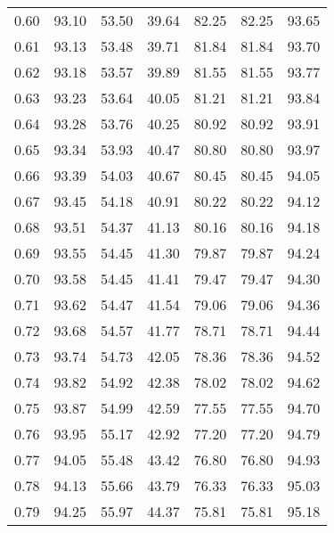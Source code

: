 \begin{tabular}{|c|c|c|c|c|c|c|}
      0.60 &     93.10 &     53.50 &      39.64 &   82.25 &      82.25 &         93.65 \\
      0.61 &     93.13 &     53.48 &      39.71 &   81.84 &      81.84 &         93.70 \\
      0.62 &     93.18 &     53.57 &      39.89 &   81.55 &      81.55 &         93.77 \\
      0.63 &     93.23 &     53.64 &      40.05 &   81.21 &      81.21 &         93.84 \\
      0.64 &     93.28 &     53.76 &      40.25 &   80.92 &      80.92 &         93.91 \\
      0.65 &     93.34 &     53.93 &      40.47 &   80.80 &      80.80 &         93.97 \\
      0.66 &     93.39 &     54.03 &      40.67 &   80.45 &      80.45 &         94.05 \\
      0.67 &     93.45 &     54.18 &      40.91 &   80.22 &      80.22 &         94.12 \\
      0.68 &     93.51 &     54.37 &      41.13 &   80.16 &      80.16 &         94.18 \\
      0.69 &     93.55 &     54.45 &      41.30 &   79.87 &      79.87 &         94.24 \\
      0.70 &     93.58 &     54.45 &      41.41 &   79.47 &      79.47 &         94.30 \\
      0.71 &     93.62 &     54.47 &      41.54 &   79.06 &      79.06 &         94.36 \\
      0.72 &     93.68 &     54.57 &      41.77 &   78.71 &      78.71 &         94.44 \\
      0.73 &     93.74 &     54.73 &      42.05 &   78.36 &      78.36 &         94.52 \\
      0.74 &     93.82 &     54.92 &      42.38 &   78.02 &      78.02 &         94.62 \\
      0.75 &     93.87 &     54.99 &      42.59 &   77.55 &      77.55 &         94.70 \\
      0.76 &     93.95 &     55.17 &      42.92 &   77.20 &      77.20 &         94.79 \\
      0.77 &     94.05 &     55.48 &      43.42 &   76.80 &      76.80 &         94.93 \\
      0.78 &     94.13 &     55.66 &      43.79 &   76.33 &      76.33 &         95.03 \\
      0.79 &     94.25 &     55.97 &      44.37 &   75.81 &      75.81 &         95.18 \\

\end{tabular}
